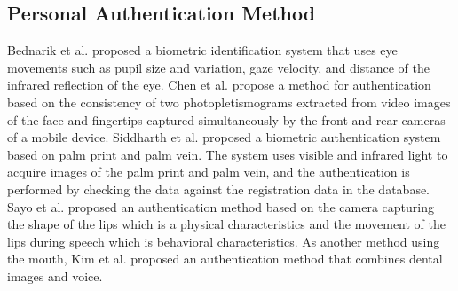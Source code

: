 \documentclass[sigchi,authordraft]{acmart}
\begin{document}

\subsection{Personal Authentication Method}
Bednarik et al.\cite{eye_movement} proposed a biometric identification system that uses eye movements such as pupil size and variation, gaze velocity, and distance of the infrared reflection of the eye. Chen et al.\cite{face_and_finger} propose a method for authentication based on the consistency of two photopletismograms extracted from video images of the face and fingertips captured simultaneously by the front and rear cameras of a mobile device. Siddharth et al.\cite{palm_print} proposed a biometric authentication system based on palm print and palm vein. The system uses visible and infrared light to acquire images of the palm print and palm vein, and the authentication is performed by checking the data against the registration data in the database. Sayo et al.\cite{lip_motion} proposed an authentication method based on the camera capturing the shape of the lips which is a physical characteristics and the movement of the lips during speech which is behavioral characteristics. As another method using the mouth, Kim et al.\cite{teeth_and_voice} proposed an authentication method that combines dental images and voice.

\end{document}
